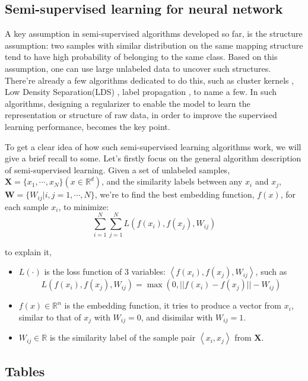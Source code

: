 \documentclass[3p,times,procedia]{elsarticle}
\begin{document}
\subsection{Semi-supervised learning for
neural network}
A key assumption in semi-supervised 
algorithms developed so far, is the 
structure assumption: two samples with 
similar distribution on the same mapping 
structure tend to have high probability 
of belonging to the same class. Based on 
this assumption, one can use large 
unlabeled data to uncover such 
structures. There're already a few 
algorithms dedicated to do this,
such as cluster kernels
\cite{chapelle2003cluster},
Low Density Separation(LDS)
\cite{chapelle2005semi},
label propagation
\cite{zhu2002learning},
to name a few.
In such algorithms, designing a regularizer
to enable the model to learn the representation
or structure of raw data, in order to improve
the supervised learning performance, becomes
the key point.

To get a clear idea of how such semi-supervised
learning algorithms work, we will give a brief 
recall to some.
Let's firstly focus on the general algorithm
description of semi-supervised learning.
Given a set of unlabeled samples,
$\mathbf{X}=\{x_1,\cdots,x_N\}
(x\in\mathbb{R}^d)$,
and the similarity labels between any
$x_i$ and $x_j$,
$\mathbf{W}=\{W_{ij}|i,j=1,\cdots,N\}$,
we're to find the best embedding function, 
$f(x)$, for each sample $x_i$, to minimize:
\begin{equation}
\sum^{N}_{i=1}\sum^{N}_{j=1}L(f(x_i),f(x_j),W_{ij})
\label{eq:1}
\end{equation}

to explain it,
\begin{itemize}[]
\item $L(\cdot)$ is the loss function of 3 variables: 
$\left<f(x_i),f(x_j),W_{ij}\right>$, 
such as 
$$L(f(x_i),f(x_j),W_{ij}) = 
\max(0,||f(x_i)-f(x_j)||-W_{ij})$$
\item $f(x)\in\mathbb{R}^n$ is the embedding function, it tries to produce
a vector from $x_i$, similar to that of $x_j$ with $W_{ij}=0$,
and disimilar with $W_{ij}=1$.
\item $W_{ij}\in \mathbb{R}$ is the similarity label of the sample pair
$\left<x_i,x_j\right>$ from $\mathbf{X}$.
\end{itemize}



\subsection{ Tables}
\end{document}
